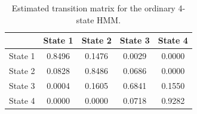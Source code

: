 \begin{table}[ht]
\centering
\begin{tabular}{lcccc}
\hline
 & State 1 & State 2 & State 3 & State 4 \\
\hline
State 1 & 0.8496 & 0.1476 & 0.0029 & 0.0000 \\
State 2 & 0.0828 & 0.8486 & 0.0686 & 0.0000 \\
State 3 & 0.0004 & 0.1605 & 0.6841 & 0.1550 \\
State 4 & 0.0000 & 0.0000 & 0.0718 & 0.9282 \\
\hline
\end{tabular}
\caption{Estimated transition matrix for the ordinary 4-state HMM.}
\label{tab:ordinary_hmm_transition}
\end{table}
